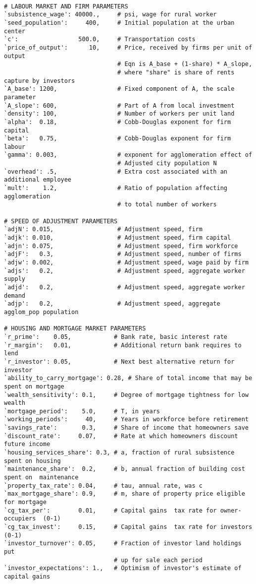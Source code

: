 {\small\begin{verbatim} 

# LABOUR MARKET AND FIRM PARAMETERS
`subsistence_wage': 40000.,     # psi, wage for rural worker
`seed_population':     400,     # Initial population at the urban center 
`c':                 500.0,     # Transportation costs
`price_of_output':      10,     # Price, received by firms per unit of output
                                # Eqn is A_base + (1-share) * A_slope,  
                                # where "share" is share of rents capture by investors 
`A_base': 1200,                 # Fixed component of A, the scale parameter
`A_slope': 600,                 # Part of A from local investment 
`density': 100,                 # Number of workers per unit land
`alpha':  0.18,                 # Cobb-Douglas exponent for firm capital
`beta':   0.75,                 # Cobb-Douglas exponent for firm labour
`gamma': 0.003,                 # exponent for agglomeration effect of 
                                # Adjusted city population N
`overhead': .5,                 # Extra cost associated with an additional employee 
`mult':    1.2,                 # Ratio of population affecting agglomeration 
                                # to total number of workers 

# SPEED OF ADJUSTMENT PARAMETERS 
`adjN': 0.015,                  # Adjustment speed, firm
`adjk': 0.010,                  # Adjustment speed, firm capital
`adjn': 0.075,                  # Adjustment speed, firm workforce
`adjF':   0.3,                  # Adjustment speed, number of firms
`adjw': 0.002,                  # Adjustment speed, wage paid by firm
`adjs':   0.2,                  # Adjustment speed, aggregate worker supply 
`adjd':   0.2,                  # Adjustment speed, aggregate worker demand 
`adjp':   0.2,                  # Adjustment speed, aggregate agglom_pop population

# HOUSING AND MORTGAGE MARKET PARAMETERS
`r_prime':    0.05,            # Bank rate, basic interest rate
`r_margin':   0.01,            # Additional return bank requires to lend
`r_investor': 0.05,            # Next best alternative return for investor
`ability_to_carry_mortgage': 0.28, # Share of total income that may be spent on mortgage
`wealth_sensitivity': 0.1,     # Degree of mortgage tightness for low wealth
`mortgage_period':    5.0,     # T, in years
`working_periods':     40,     # Years in workforce before retirement
`savings_rate':       0.3,     # Share of income that homeowners save
`discount_rate':     0.07,     # Rate at which homeowners discount future income
`housing_services_share': 0.3, # a, fraction of rural subsistence spent on housing
`maintenance_share':  0.2,     # b, annual fraction of building cost spent on  maintenance
`property_tax_rate': 0.04,     # tau, annual rate, was c
`max_mortgage_share': 0.9,     # m, share of property price eligible for mortgage
`cg_tax_per':        0.01,     # Capital gains  tax rate for owner-occupiers  (0-1)
`cg_tax_invest':     0.15,     # Capital gains  tax rate for investors  (0-1)
`investor_turnover': 0.05,     # Fraction of investor land holdings put 
                               # up for sale each period
`investor_expectations': 1.,   # Optimism of investor's estimate of capital gains
\end{verbatim} }